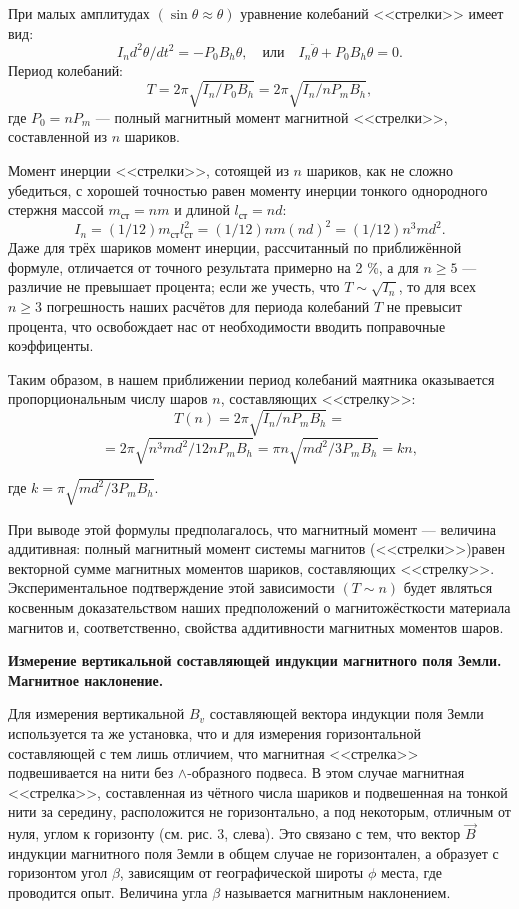 \documentclass[a4paper, fontsize=14pt]{article}
\begin{document}
 При малых амплитудах $(\sin \theta \approx \theta)$ уравнение колебаний <<стрелки>> имеет вид:
\[
	I_n d^2 \theta / dt^2 = - P_0 B_h 	\theta, \quad \text{или} \quad I_n \ddot \theta 	+ P_0 B_h \theta = 0.
\]
Период колебаний:
\[
	T = 2 \pi \sqrt{I_n / P_0 B_h} = 2 \pi \sqrt{I_n / n P_m B_h},
\]
где $P_0 = nP_m$ --- полный магнитный момент магнитной <<стрелки>>, составленной
из $n$ шариков.

Момент инерции <<стрелки>>, сотоящей из $n$ шариков, как не сложно убедиться, с хорошей точностью равен моменту инерции тонкого однородного стержня массой $m_{ст} = nm$ и длиной $l_{ст} = nd$:
\[
	I_n = (1/12)m_{\text{ст}}l_{\text{ст}}^2 = (1/12)nm(nd)^2 = (1/12)n^3md^2.
\]
Даже для трёх шариков момент инерции, рассчитанный по приближённой формуле, отличается от точного результата примерно на 2 \%, а для $n \ge 5$ --- различие не превышает процента; если же учесть, что $T \sim \sqrt{I_n}$, то для всех $n \ge 3$ погрешность наших расчётов для периода колебаний $T$ не превысит процента, что освобождает нас от необходимости вводить поправочные коэффиценты.

Таким образом, в нашем приближении период колебаний маятника оказывается пропорциональным числу шаров $n$, составляющих <<стрелку>>:
\[
	T(n) = 2 \pi \sqrt{I_n / n P_m B_h} = 
	\]
	\[
	= 2 \pi \sqrt{n^3 m d^2 / 12 n P_m B_h}
	 = \pi n \sqrt{m d^2 / 3 P_m B_h} = kn,
\]

где $k = \pi \sqrt{m d^2 / 3 P_m B_h}$.

 При выводе этой формулы предполагалось, что магнитный момент --- величина аддитивная: полный магнитный момент системы магнитов (<<стрелки>>)равен векторной сумме магнитных моментов шариков, составляющих <<стрелку>>. Экспериментальное подтверждение этой зависимости $(T \sim n)$ будет являться косвенным доказательством наших предположений о магнитожёсткости материала магнитов и, соответственно, свойства аддитивности магнитных моментов шаров.
 
\textbf{Измерение вертикальной составляющей индукции магнитного поля Земли. Магнитное наклонение.} 

Для измерения вертикальной $B_v$ составляющей вектора индукции поля Земли используется та же установка, что и для измерения горизонтальной составляющей  с  тем  лишь  отличием, что магнитная <<стрелка>> подвешивается на нити без $\wedge$-образного подвеса. В этом случае магнитная  <<стрелка>>,  составленная  из  чётного  числа шариков и подвешенная на тонкой нити за середину, расположится не горизонтально, а под некоторым, отличным от нуля, углом к горизонту (см. рис. 3, слева). Это связано с тем, что вектор $\vec B$  индукции магнитного поля Земли в общем случае  не  горизонтален,  а  образует  с  горизонтом угол $\beta$, зависящим от географической широты $\phi$ места,  где  проводится  опыт. Величина  угла $\beta$ называется магнитным наклонением.
\end{document}
